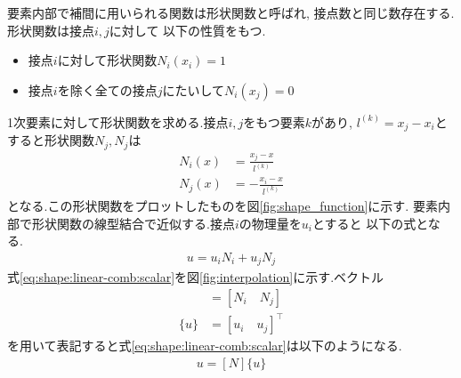 \documentclass[paper=a4]{jlreq}
\begin{document}
要素内部で補間に用いられる関数は形状関数と呼ばれ, 接点数と同じ数存在する.
形状関数は接点$i,j$に対して
以下の性質をもつ.
\begin{itemize}
    \item 接点$i$に対して形状関数$N_i(x_i) = 1$
    \item 接点$i$を除く全ての接点$j$にたいして$N_i(x_j) = 0$
\end{itemize}
1次要素に対して形状関数を求める.接点$i,j$をもつ要素$k$があり, 
$l^{(k)} = x_j-x_i$とすると形状関数$N_j,N_j$は
\begin{align}
    N_i(x) & = \frac{x_j -x}{l^{(k)}} \label{eq:shape:i}  \\
    N_j(x) & = -\frac{x_i -x}{l^{(k)}} \label{eq:shape:j}
\end{align}
となる.この形状関数をプロットしたものを図\ref{fig:shape_function}に示す.
要素内部で形状関数の線型結合で近似する.接点$i$の物理量を$u_i$とすると
以下の式となる.
\begin{align}
    u = u_iN_i+u_jN_j \label{eq:shape:linear-comb:scalar}
\end{align}
式\eqref{eq:shape:linear-comb:scalar}を図\ref{fig:interpolation}に示す.ベクトル
\begin{align}
    [N]   & = [N_i \quad N_j] \label{eq:shape:mat}           \\
    \{u\} & = [u_i \quad u_j]^\intercal \label{eq:value:mat}
\end{align}
を用いて表記すると式\eqref{eq:shape:linear-comb:scalar}は以下のようになる.
\begin{align}
    u = [N]\{u\} \label{eq:shape:linear-comb}
\end{align}
\end{document}
